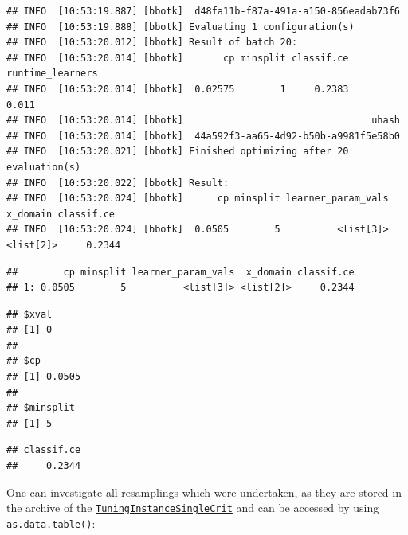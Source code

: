 \documentclass[
]{scrbook}
\newenvironment{Shaded}{\begin{snugshade}}{\end{snugshade}}
\newcommand{\FunctionTok}[1]{\textcolor[rgb]{0.00,0.00,0.00}{#1}}
\newcommand{\NormalTok}[1]{#1}
\newcommand{\SpecialCharTok}[1]{\textcolor[rgb]{0.00,0.00,0.00}{#1}}
\renewenvironment{Shaded} {\begin{snugshade}\small} {\end{snugshade}}
\begin{document}
\begin{verbatim}
## INFO  [10:53:19.887] [bbotk]  d48fa11b-f87a-491a-a150-856eadab73f6 
## INFO  [10:53:19.888] [bbotk] Evaluating 1 configuration(s) 
## INFO  [10:53:20.012] [bbotk] Result of batch 20: 
## INFO  [10:53:20.014] [bbotk]       cp minsplit classif.ce runtime_learners 
## INFO  [10:53:20.014] [bbotk]  0.02575        1     0.2383            0.011 
## INFO  [10:53:20.014] [bbotk]                                 uhash 
## INFO  [10:53:20.014] [bbotk]  44a592f3-aa65-4d92-b50b-a9981f5e58b0 
## INFO  [10:53:20.021] [bbotk] Finished optimizing after 20 evaluation(s) 
## INFO  [10:53:20.022] [bbotk] Result: 
## INFO  [10:53:20.024] [bbotk]      cp minsplit learner_param_vals  x_domain classif.ce 
## INFO  [10:53:20.024] [bbotk]  0.0505        5          <list[3]> <list[2]>     0.2344
\end{verbatim}

\begin{verbatim}
##        cp minsplit learner_param_vals  x_domain classif.ce
## 1: 0.0505        5          <list[3]> <list[2]>     0.2344
\end{verbatim}

\begin{Shaded}
\end{Shaded}

\begin{verbatim}
## $xval
## [1] 0
## 
## $cp
## [1] 0.0505
## 
## $minsplit
## [1] 5
\end{verbatim}

\begin{Shaded}
\end{Shaded}

\begin{verbatim}
## classif.ce 
##     0.2344
\end{verbatim}

One can investigate all resamplings which were undertaken, as they are stored in the archive of the \href{https://mlr3tuning.mlr-org.com/reference/TuningInstanceSingleCrit.html}{\texttt{TuningInstanceSingleCrit}} and can be accessed by using \texttt{as.data.table()}:

\begin{Shaded}
\end{Shaded}
\end{document}
